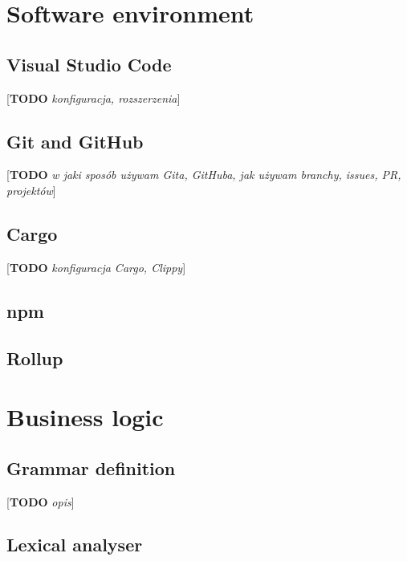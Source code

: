 \documentclass[english,engineering]{wizthesis}
\newcommand{\todo}[1]{{\color{red}[\textbf{TODO} \textit{#1}]}}
\begin{document}
\section{Software environment}

\subsection*{Visual Studio Code}

\todo{konfiguracja, rozszerzenia}

\subsection*{Git and GitHub}

\todo{w jaki sposób używam Gita, GitHuba, jak używam branchy, issues, PR,
projektów}

\subsection*{Cargo}

\todo{konfiguracja Cargo, Clippy}

\subsection*{npm}

\subsection*{Rollup}

\section{Business logic}

\subsection{Grammar definition}


\todo{opis}

\subsection{Lexical analyser}
\end{document}
